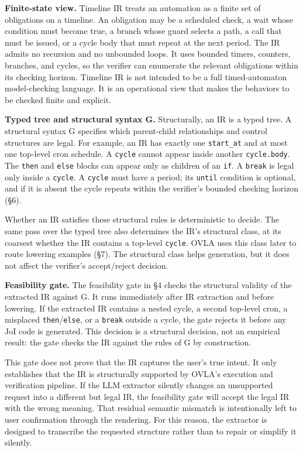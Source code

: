 \documentclass[sigconf,nonacm,anonymous,review]{acmart}
\begin{document}
\textbf{Finite-state view.} Timeline IR treats an automation as a finite set of obligations on a timeline. An obligation may be a scheduled check, a wait whose condition must become true, a branch whose guard selects a path, a call that must be issued, or a cycle body that must repeat at the next period. The IR admits no recursion and no unbounded loops. It uses bounded timers, counters, branches, and cycles, so the verifier can enumerate the relevant obligations within its checking horizon. Timeline IR is not intended to be a full timed-automaton model-checking language. It is an operational view that makes the behaviors to be checked finite and explicit.

\textbf{Typed tree and structural syntax G.} Structurally, an IR is a typed tree. A structural syntax G specifies which parent-child relationships and control structures are legal. For example, an IR has exactly one \texttt{start\_at} and at most one top-level cron schedule. A \texttt{cycle} cannot appear inside another \texttt{cycle.body}. The \texttt{then} and \texttt{else} blocks can appear only as children of an \texttt{if}. A \texttt{break} is legal only inside a \texttt{cycle}. A \texttt{cycle} must have a period; its \texttt{until} condition is optional, and if it is absent the cycle repeats within the verifier's bounded checking horizon (\S6).

Whether an IR satisfies these structural rules is deterministic to decide. The same pass over the typed tree also determines the IR's structural class, at its coarsest whether the IR contains a top-level \texttt{cycle}. OVLA uses this class later to route lowering examples (\S7). The structural class helps generation, but it does not affect the verifier's accept/reject decision.

\textbf{Feasibility gate.} The feasibility gate in \S4 checks the structural validity of the extracted IR against G. It runs immediately after IR extraction and before lowering. If the extracted IR contains a nested cycle, a second top-level cron, a misplaced \texttt{then}/\texttt{else}, or a \texttt{break} outside a cycle, the gate rejects it before any JoI code is generated. This decision is a structural decision, not an empirical result: the gate checks the IR against the rules of G by construction.

This gate does not prove that the IR captures the user's true intent. It only establishes that the IR is structurally supported by OVLA's execution and verification pipeline. If the LLM extractor silently changes an unsupported request into a different but legal IR, the feasibility gate will accept the legal IR with the wrong meaning. That residual semantic mismatch is intentionally left to user confirmation through the rendering. For this reason, the extractor is designed to transcribe the requested structure rather than to repair or simplify it silently.
\end{document}
